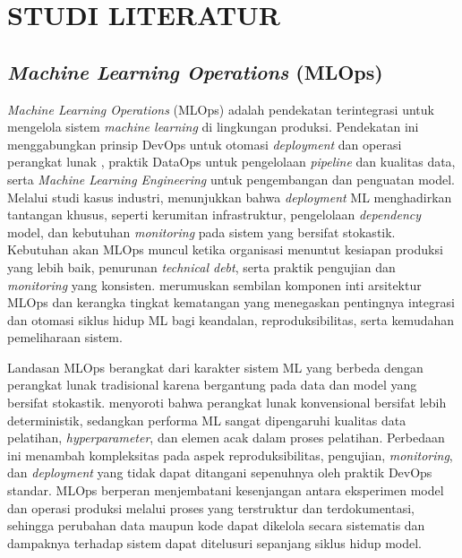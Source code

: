 \chapter{STUDI LITERATUR}
\label{chap:studi_literatur}

\section{\textit{Machine Learning Operations} (MLOps)}

\textit{Machine Learning Operations} (MLOps) adalah pendekatan terintegrasi untuk mengelola sistem \textit{machine learning} di lingkungan produksi. Pendekatan ini menggabungkan prinsip DevOps untuk otomasi \textit{deployment} dan operasi perangkat lunak \autocite{devopshandbook2016}, praktik DataOps untuk pengelolaan \textit{pipeline} dan kualitas data, serta \textit{Machine Learning Engineering} untuk pengembangan dan penguatan model. Melalui studi kasus industri, \textcite{paleyes2022challenges} menunjukkan bahwa \textit{deployment} ML menghadirkan tantangan khusus, seperti kerumitan infrastruktur, pengelolaan \textit{dependency} model, dan kebutuhan \textit{monitoring} pada sistem yang bersifat stokastik. Kebutuhan akan MLOps muncul ketika organisasi menuntut kesiapan produksi yang lebih baik, penurunan \textit{technical debt}, serta praktik pengujian dan \textit{monitoring} yang konsisten. \textcite{kreuzberger2023mlops} merumuskan sembilan komponen inti arsitektur MLOps dan kerangka tingkat kematangan yang menegaskan pentingnya integrasi dan otomasi siklus hidup ML bagi keandalan, reproduksibilitas, serta kemudahan pemeliharaan sistem.

Landasan MLOps berangkat dari karakter sistem ML yang berbeda dengan perangkat lunak tradisional karena bergantung pada data dan model yang bersifat stokastik. \textcite{sculley2015hidden} menyoroti bahwa perangkat lunak konvensional bersifat lebih deterministik, sedangkan performa ML sangat dipengaruhi kualitas data pelatihan, \textit{hyperparameter}, dan elemen acak dalam proses pelatihan. Perbedaan ini menambah kompleksitas pada aspek reproduksibilitas, pengujian, \textit{monitoring}, dan \textit{deployment} yang tidak dapat ditangani sepenuhnya oleh praktik DevOps standar. MLOps berperan menjembatani kesenjangan antara eksperimen model dan operasi produksi melalui proses yang terstruktur dan terdokumentasi, sehingga perubahan data maupun kode dapat dikelola secara sistematis dan dampaknya terhadap sistem dapat ditelusuri sepanjang siklus hidup model.

